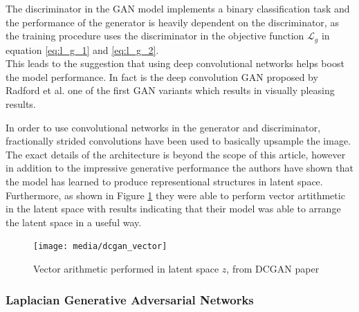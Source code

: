 The discriminator in the GAN model implements a binary classification task and the performance of the generator is heavily dependent on the discriminator, as the training procedure uses the discriminator in the objective function $\mathcal{L}_{g}$ in equation \ref{eq:l_g_1} and \ref{eq:l_g_2}.\\
This leads to the suggestion that using deep convolutional networks helps boost the model performance. In fact is the deep convolution GAN proposed by Radford et al.\cite{dcgan:2015} one of the first GAN variants which results in visually pleasing results.

In order to use convolutional networks in the generator and discriminator, fractionally strided convolutions have been used to basically upsample the image. The exact details of the architecture is beyond the scope of this article, however in addition to the impressive generative performance the authors have shown that the model has learned to produce representional structures in latent space.
Furthermore, as shown in Figure \ref{fig:dcgan_vector} they were able to perform vector artithmetic in the latent space with results indicating that their model was able to arrange the latent space in a useful way.

\begin{figure}[t]
\centering
  \texttt{[image: media/dcgan\_vector]}
  \caption[Vector arithmetic in DCGAN]{Vector arithmetic performed in latent space $z$, from DCGAN paper\cite{dcgan:2015}}
  \label{fig:dcgan_vector}
  \medskip
  \small
\end{figure}

\newpage
\subsubsection{Laplacian Generative Adversarial Networks}
\label{ssub:lapgan}


